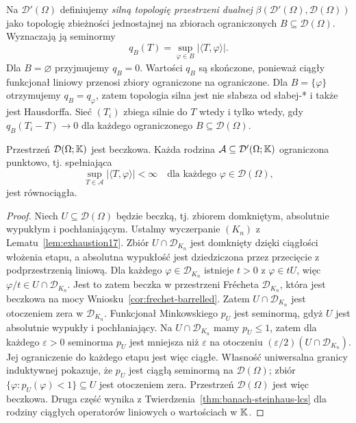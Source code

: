 \begin{definicja}
\label{def:strong19}
Na $\mathcal D'(\Omega)$ definiujemy
\emph{silną topologię przestrzeni dualnej}
$\beta(\mathcal D'(\Omega),\mathcal D(\Omega))$
jako topologię zbieżności jednostajnej na zbiorach
ograniczonych $B\subseteq\mathcal D(\Omega)$.
Wyznaczają ją seminormy
\[q_B(T)=\sup_{\varphi\in B}|\langle T,\varphi\rangle|.\]
Dla $B=\varnothing$ przyjmujemy $q_B=0$.
Wartości $q_B$ są skończone, ponieważ ciągły funkcjonał
liniowy przenosi zbiory ograniczone na ograniczone.
Dla $B=\{\varphi\}$ otrzymujemy $q_B=q_\varphi$,
zatem topologia silna jest nie słabsza od słabej-*
i także jest Hausdorffa. Sieć $(T_i)$ zbiega silnie do $T$
wtedy i tylko wtedy, gdy $q_B(T_i-T)\to0$
dla każdego ograniczonego $B\subseteq\mathcal D(\Omega)$.
\end{definicja}

\begin{twierdzenie}
\label{thm:D-barrelled19}
Przestrzeń $\mathcal D(\Omega;\mathbb K)$ jest beczkowa.
Każda rodzina $\mathcal A\subseteq\mathcal D'(\Omega;\mathbb K)$
ograniczona punktowo, tj. spełniająca
\[\sup_{T\in\mathcal A}|\langle T,\varphi\rangle|<\infty
\quad\text{dla każdego }\varphi\in\mathcal D(\Omega),\]
jest równociągła.
\end{twierdzenie}
\begin{proof}
Niech $U\subseteq\mathcal D(\Omega)$ będzie
beczką, tj. zbiorem domkniętym, absolutnie wypukłym
i pochłaniającym. Ustalmy wyczerpanie $(K_n)$ z Lematu~\ref{lem:exhaustion17}.
Zbiór $U\cap\mathcal D_{K_n}$ jest domknięty dzięki ciągłości
włożenia etapu, a absolutna wypukłość jest dziedziczona
przez przecięcie z podprzestrzenią liniową. Dla każdego
$\varphi\in\mathcal D_{K_n}$ istnieje $t>0$ z $\varphi\in tU$,
więc $\varphi/t\in U\cap\mathcal D_{K_n}$.
Jest to zatem beczka w przestrzeni Frécheta $\mathcal D_{K_n}$,
która jest beczkowa na mocy Wniosku~\ref{cor:frechet-barrelled}. Zatem
$U\cap\mathcal D_{K_n}$ jest otoczeniem zera
w $\mathcal D_{K_n}$.
Funkcjonał Minkowskiego $p_U$ jest seminormą, gdyż $U$
jest absolutnie wypukły i pochłaniający.
Na $U\cap\mathcal D_{K_n}$ mamy $p_U\le1$, zatem dla
każdego $\varepsilon>0$ seminorma $p_U$ jest mniejsza niż
$\varepsilon$ na otoczeniu $(\varepsilon/2)(U\cap\mathcal D_{K_n})$.
Jej ograniczenie do każdego etapu jest więc ciągłe. Własność uniwersalna
granicy induktywnej pokazuje, że $p_U$ jest ciągłą
seminormą na $\mathcal D(\Omega)$; zbiór
$\{\varphi:p_U(\varphi)<1\}\subseteq U$ jest otoczeniem
zera. Przestrzeń $\mathcal D(\Omega)$ jest więc beczkowa.
Druga część wynika z Twierdzenia~\ref{thm:banach-steinhaus-lcs}
dla rodziny ciągłych operatorów liniowych o wartościach w $\mathbb K$.
\end{proof}

